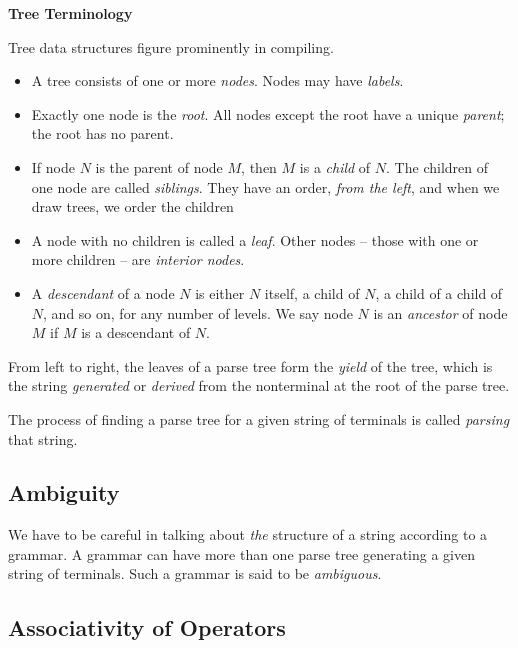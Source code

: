 \documentclass[12pt,a4paper,twoside,openany]{book}
\begin{document}
\begin{framed}
    \begin{center}
        \textbf{{\large Tree Terminology}}
    \end{center}

    Tree data structures figure prominently in compiling.
    \begin{itemize}
        \item A tree consists of one or more \textit{nodes}. Nodes may have \textit{labels}.
        \item Exactly one node is the \textit{root}. All nodes except the root have a unique \textit{parent}; the root has no parent.
        \item If node $N$ is the parent of node $M$, then $M$ is a \textit{child} of $N$. The children of one node are called \textit{siblings}. They have an order, \textit{from the left}, and when we draw trees, we order the children 
        \item A node with no children is called a \textit{leaf}. Other nodes -- those with one or more children -- are \textit{interior nodes}.
        \item A \textit{descendant} of a node $N$ is either $N$ itself, a child of $N$, a child of a child of $N$, and so on, for any number of levels. We say node $N$ is an \textit{ancestor} of node $M$ if $M$ is a descendant of $N$.
    \end{itemize}
\end{framed}

From left to right, the leaves of a parse tree form the \textit{yield} of the tree, which is the string \textit{generated} or \textit{derived} from the nonterminal at the root of the parse tree.

The process of finding a parse tree for a given string of terminals is called \textit{parsing} that string.

\subsection{Ambiguity}

We have to be careful in talking about \textit{the} structure of a string according to a grammar. A grammar can have more than one parse tree generating a given string of terminals. Such a grammar is said to be \textit{ambiguous}.

\subsection{Associativity of Operators}
\end{document}
